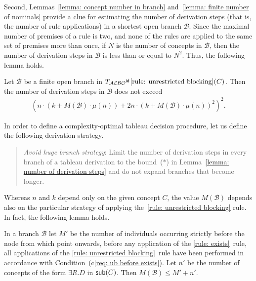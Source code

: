 \documentclass[leqno
,pdflatex
,prodmode
,acmtocl
]{acmsmall}
\newcommand{\mathcmd}[1]{\ensuremath{#1}\xspace}
\newcommand{\dlfont}{\mathcal}
\newcommand{\dl}[1]{\mathcmd{\dlfont{#1}}}
\newcommand{\idRole}{\mathcmd{\textsf{\upshape\mdseries id}}}
\newcommand{\ALBOid}{\dl{ALBO\smash[t]{\mbox{${}^{\idRole}$}}}}
\newcommand{\sub}{\mathcmd{\textsf{\upshape sub}}}
\newcommand{\branch}[1]{\seg{#1}}
\newcommand{\seg}[1]{\mathcmd{\mathcal{#1}}}
\newcommand{\TALBOidub}{\mathcmd{T_\ALBOid\eqref{rule: unrestricted blocking}}}
\begin{document}
Second, Lemmas~\ref{lemma: concept number in branch} and~\ref{lemma: finite number of nominals} provide
a clue for estimating the number of derivation steps (that is, the number of rule applications)
in a shortest open branch $\branch{B}$.
Since the maximal number of premises of a rule is two,
and none of the rules are applied to the same set of premises more than once,
if $N$ is the number of concepts in $\branch{B}$, then the number of derivation steps in $\branch{B}$ is less than or equal to $N^2$.
Thus, the following lemma holds.
\begin{lemma}\label{lemma: number of derivation steps}
Let $\branch{B}$ be a finite open branch
in $\TALBOidub(C)$.
Then the number of derivation steps in $\branch{B}$ does not exceed
\begin{align}
\tag{$*$}
\left(n\cdot\left(k+M(\branch{B})\cdot\mu(n)\right)+2n\cdot\left(k+M(\branch{B})\cdot\mu(n)\right)^2\right)^2.
\end{align}
\end{lemma}

In order to define a complexity-optimal tableau decision procedure, let
us define the following derivation strategy.
\begin{quote}
\emph{Avoid huge branch strategy}:
Limit the number of derivation steps in every branch 
of a tableau derivation to the bound~($*$) in Lemma~\ref{lemma: number of derivation steps}
and do not expand branches that become longer.
\end{quote}

Whereas $n$ and $k$ depend only on the given concept $C$, the value
$M(\branch{B})$ depends
also on the particular strategy of applying the~\eqref{rule:
unrestricted blocking} rule.
In fact, the following lemma holds.

\begin{lemma}
In a branch $\branch{B}$
let $M'$ be the number of individuals occurring
strictly before the node from which point onwards, before any application of
the \eqref{rule: exists}~rule,
all applications of the \eqref{rule: unrestricted blocking}~rule
have been performed in accordance with 
Condition~(c\ref{req: ub before exists}).
Let $n'$ be the number of concepts of the form $\exists R.D$ in $\sub(C)$.
Then $M(\branch{B})\leq M'+n'$.
\end{lemma}
\end{document}
